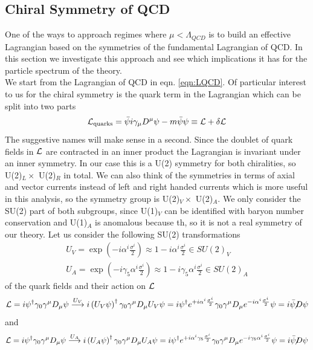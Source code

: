 \subsection{Chiral Symmetry of QCD}
One of the ways to approach regimes where $\mu < \Lambda_{QCD}$ is to build an effective Lagrangian based on the symmetries of the fundamental Lagrangian of QCD. In this section we investigate this approach and see which implications it has for the particle spectrum of the theory. \\
We start from the Lagrangian of QCD in eqn. \ref{eqn:LQCD}. Of particular interest to us for the chiral symmetry is the quark term in the Lagrangian which can be split into two parts
\begin{equation}
\mathcal{L}_{\mathrm{quarks}} = \bar{\psi} i\gamma_{\mu} D^{\mu} \psi - m \bar{\psi} \psi \equiv \mathcal{L} + \delta\mathcal{L}
\end{equation}
The suggestive names will make sense in a second. 
Since the doublet of quark fields in $\mathcal{L}$ are contracted in an inner product the Lagrangian is invariant under an inner symmetry. In our case this is a U(2) symmetry for both chiralities, so U(2)$_L \times$ U(2)$_R$ in total. We can also think of the symmetries in terms of axial and vector currents instead of left and right handed currents which is more useful in this analysis, so the symmetry group is U(2)$_V \times$ U(2)$_A$. We only consider the SU(2) part of both subgroups, since U(1)$_V$ can be identified with baryon number conservation and U(1)$_A$ is anomalous because th, so it is not a real symmetry of our theory. Let us consider the following SU(2) transformations
\begin{align}
& U_V = \exp \left(-i \alpha^i \frac{\sigma^i}{2} \right) \approx 1 - i\alpha^i \frac{\sigma^i}{2} \in SU(2)_V & \label{eqn:Vtrafo} \\
& U_A = \exp \left(-i \gamma_5 \alpha^i \frac{\sigma^i}{2} \right) \approx 1 - i \gamma_5 \alpha^i \frac{\sigma^i}{2} \in SU(2)_A & \label{eqn:Atrafo}
\end{align}
of the quark fields and their action on $\mathcal{L}$
\begin{equation}
\Lag = i \psi^{\dagger} \gamma_0 \gamma^{\mu} D_{\mu} \psi \overset{U_V}{\longrightarrow} i \left( U_V \psi \right)^{\dagger} \gamma_0 \gamma^{\mu} D_{\mu} U_V \psi = i \psi^{\dagger} e^{+i \alpha^i \frac{\sigma^i}{2}} \gamma_0 \gamma^{\mu} D_{\mu} e^{-i \alpha^i \frac{\sigma^i}{2}} \psi = i \bar{\psi} \fsl{D} \psi
\end{equation}
and
\begin{equation}
\Lag = i \psi^{\dagger} \gamma_0 \gamma^{\mu} D_{\mu} \psi \overset{U_A}{\longrightarrow} i \left( U_A \psi \right)^{\dagger} \gamma_0 \gamma^{\mu} D_{\mu} U_A \psi = i \psi^{\dagger} e^{+i \alpha^i \gamma_5 \frac{\sigma^i}{2}} \gamma_0 \gamma^{\mu} D_{\mu} e^{-i \gamma_5 \alpha^i \frac{\sigma^i}{2}} \psi = i \bar{\psi} \fsl{D} \psi
\end{equation}
